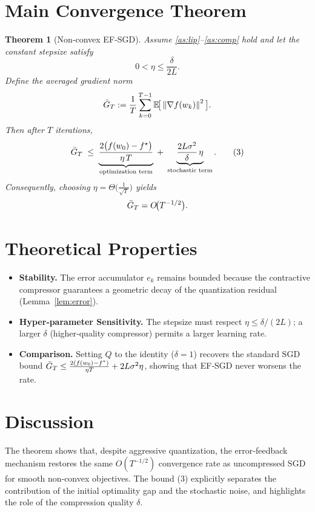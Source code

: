 \documentclass[11pt]{article}
\newtheorem{theorem}{Theorem}
\newcommand{\E}{\mathbb{E}}
\newcommand{\norm}[1]{\left\|#1\right\|}
\begin{document}
\section*{Main Convergence Theorem}
\begin{theorem}[Non‑convex EF‑SGD]\label{thm:main}
Assume \ref{as:lip}–\ref{as:comp} hold and let the constant stepsize satisfy
\[
0<\eta\le\frac{\delta}{2L}.
\]
Define the averaged gradient norm
\[
\Bar G_{T}:=\frac{1}{T}\sum_{k=0}^{T-1}\E\!\big[\norm{\nabla f(w_{k})}^{2}\big].
\]
Then after $T$ iterations,
\[
\Bar G_{T}\;\le\;
\underbrace{\frac{2\big(f(w_{0})-f^{\star}\big)}{\eta\,T}}_{\text{optimization term}}
\;+\;
\underbrace{\frac{2L\sigma^{2}}{\delta}\,\eta}_{\text{stochastic term}}.
\tag{3}
\]
Consequently, choosing $\eta=\Theta\!\big(\tfrac{1}{\sqrt{T}}\big)$ yields
\[
\Bar G_{T}=O\!\big(T^{-1/2}\big).
\]
\end{theorem}

\section*{Theoretical Properties}
\begin{itemize}[leftmargin=*]
\item \textbf{Stability.} The error accumulator $e_{k}$ remains bounded because the contractive compressor guarantees a geometric decay of the quantization residual (Lemma~\ref{lem:error}).
\item \textbf{Hyper‑parameter Sensitivity.} The stepsize must respect $\eta\le\delta/(2L)$; a larger $\delta$ (higher‑quality compressor) permits a larger learning rate.
\item \textbf{Comparison.} Setting $Q$ to the identity ($\delta=1$) recovers the standard SGD bound
$\Bar G_{T}\le\frac{2(f(w_{0})-f^{\star})}{\eta T}+2L\sigma^{2}\eta$, showing that EF‑SGD never worsens the rate.
\end{itemize}

\section*{Discussion}
The theorem shows that, despite aggressive quantization, the error‑feedback mechanism restores the same $O(T^{-1/2})$ convergence rate as uncompressed SGD for smooth non‑convex objectives. The bound (3) explicitly separates the contribution of the initial optimality gap and the stochastic noise, and highlights the role of the compression quality $\delta$.

\newpage
\end{document}
